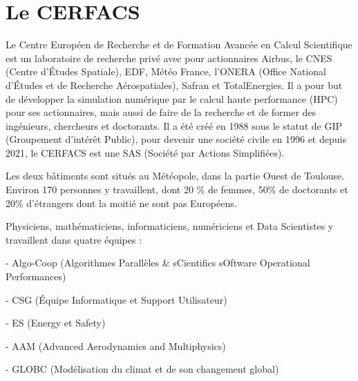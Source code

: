 \chapter{Le CERFACS}

Le Centre Européen de Recherche et de Formation Avancée en Calcul Scientifique est un laboratoire de recherche privé avec pour actionnaires Airbus, le CNES (Centre d'Études Spatiale), EDF, Météo France, l'ONERA (Office National d'Études et de Recherche Aérospatiales), Safran et TotalEnergies. Il a pour but de développer la simulation numérique par le calcul haute performance (HPC) pour ses actionnaires, mais aussi de faire de la recherche et de former des ingénieurs, chercheurs et doctorants. Il a été créé en 1988 sous le statut de GIP (Groupement d’intérêt Public), pour devenir une société civile en 1996 et depuis 2021, le CERFACS est une SAS (Société par Actions Simplifiées).

Les deux bâtiments sont situés au Météopole, dans la partie Ouest de Toulouse. Environ 170 personnes y travaillent, dont 20 \% de femmes, 50\% de doctorants et 20\% d'étrangers dont la moitié ne sont pas Européens.

Physiciens, mathématiciens, informaticiens, numériciens et Data Scientistes y travaillent dans quatre équipes :


- Algo-Coop (Algorithmes Parallèles \& sCientifics sOftware Operational Performances)

- CSG (Équipe Informatique et Support Utilisateur)

- ES (Energy et Safety)

- AAM (Advanced Aerodynamics and Multiphysics)

- GLOBC (Modélisation du climat et de son changement global)


